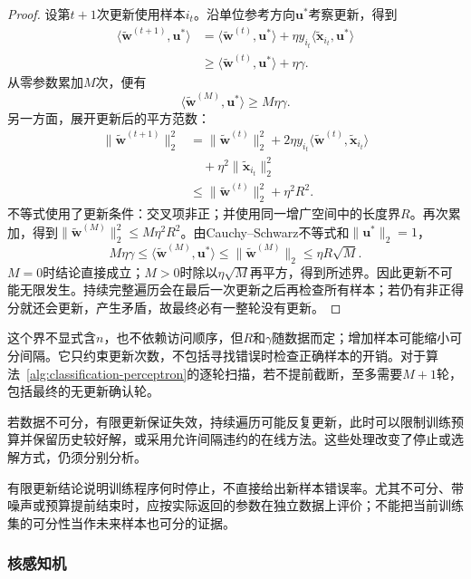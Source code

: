 \begin{proof}
  设第$t+1$次更新使用样本$i_t$。沿单位参考方向$\bm{u}^\ast$考察更新，得到
  \begin{align*}
    \langle\tilde{\bm{w}}^{(t+1)},\bm{u}^\ast\rangle
      &=\langle\tilde{\bm{w}}^{(t)},\bm{u}^\ast\rangle
        +\eta y_{i_t}\langle\tilde{\bm{x}}_{i_t},\bm{u}^\ast\rangle\\
      &\geq\langle\tilde{\bm{w}}^{(t)},\bm{u}^\ast\rangle+\eta\gamma .
  \end{align*}
  从零参数累加$M$次，便有
  \[
    \langle\tilde{\bm{w}}^{(M)},\bm{u}^\ast\rangle
      \geq M\eta\gamma .
  \]
  另一方面，展开更新后的平方范数：
  \begin{align*}
    \|\tilde{\bm{w}}^{(t+1)}\|_2^2
      &=\|\tilde{\bm{w}}^{(t)}\|_2^2
        +2\eta y_{i_t}
          \langle\tilde{\bm{w}}^{(t)},\tilde{\bm{x}}_{i_t}\rangle\\
      &\quad+\eta^2\|\tilde{\bm{x}}_{i_t}\|_2^2\\
      &\leq\|\tilde{\bm{w}}^{(t)}\|_2^2+\eta^2R^2 .
  \end{align*}
  不等式使用了更新条件：交叉项非正；并使用同一增广空间中的长度界$R$。再次累加，得到$\|\tilde{\bm{w}}^{(M)}\|_2^2\leq M\eta^2R^2$。由Cauchy--Schwarz不等式和$\|\bm{u}^\ast\|_2=1$，
  \[
    M\eta\gamma
      \leq\langle\tilde{\bm{w}}^{(M)},\bm{u}^\ast\rangle
      \leq\|\tilde{\bm{w}}^{(M)}\|_2
      \leq\eta R\sqrt{M}.
  \]
  $M=0$时结论直接成立；$M>0$时除以$\eta\sqrt M$再平方，得到所述界。因此更新不可能无限发生。持续完整遍历会在最后一次更新之后再检查所有样本；若仍有非正得分就还会更新，产生矛盾，故最终必有一整轮没有更新。
\end{proof}

这个界不显式含$n$，也不依赖访问顺序，但$R$和$\gamma$随数据而定；增加样本可能缩小可分间隔。它只约束更新次数，不包括寻找错误时检查正确样本的开销。对于算法~\ref{alg:classification-perceptron}的逐轮扫描，若不提前截断，至多需要$M+1$轮，包括最终的无更新确认轮。

若数据不可分，有限更新保证失效，持续遍历可能反复更新，此时可以限制训练预算并保留历史较好解，或采用允许间隔违约的在线方法。这些处理改变了停止或选解方式，仍须分别分析。

有限更新结论说明训练程序何时停止，不直接给出新样本错误率。尤其不可分、带噪声或预算提前结束时，应按实际返回的参数在独立数据上评价；不能把当前训练集的可分性当作未来样本也可分的证据。

\subsubsection{核感知机}

